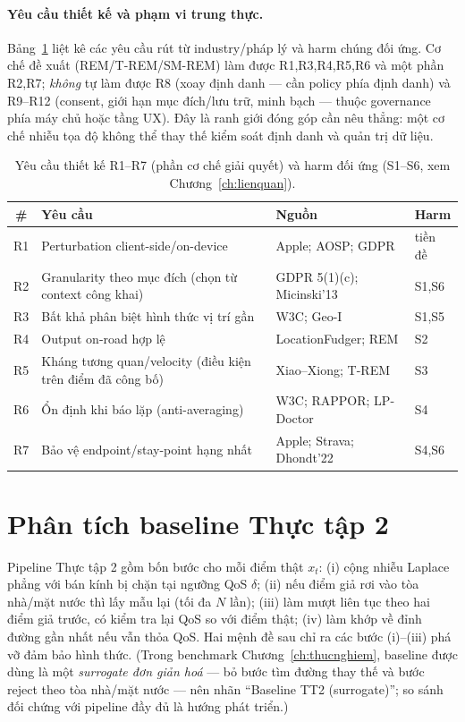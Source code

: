 \paragraph{Yêu cầu thiết kế và phạm vi trung thực.} Bảng~\ref{tab:requirements}
liệt kê các yêu cầu rút từ industry/pháp lý và harm chúng đối ứng. Cơ chế đề xuất
(REM/T-REM/SM-REM) làm được R1,R3,R4,R5,R6 và một phần R2,R7; \emph{không} tự làm
được R8 (xoay định danh --- cần policy phía định danh) và R9--R12 (consent, giới
hạn mục đích/lưu trữ, minh bạch --- thuộc governance phía máy chủ hoặc tầng UX).
Đây là ranh giới đóng góp cần nêu thẳng: một cơ chế nhiễu tọa độ không thể thay
thế kiểm soát định danh và quản trị dữ liệu.

\begin{table}[ht]
\centering
\caption{Yêu cầu thiết kế R1--R7 (phần cơ chế giải quyết) và harm đối ứng
(S1--S6, xem Chương~\ref{ch:lienquan}).}
\label{tab:requirements}
\small
\begin{tabular}{clll}
\toprule
\# & Yêu cầu & Nguồn & Harm \\
\midrule
R1 & Perturbation client-side/on-device & Apple; AOSP; GDPR & tiền đề \\
R2 & Granularity theo mục đích (chọn từ context công khai) & GDPR 5(1)(c); Micinski'13 & S1,S6 \\
R3 & Bất khả phân biệt hình thức vị trí gần & W3C; Geo-I & S1,S5 \\
R4 & Output on-road hợp lệ & LocationFudger; REM & S2 \\
R5 & Kháng tương quan/velocity (điều kiện trên điểm đã công bố) & Xiao--Xiong; T-REM & S3 \\
R6 & Ổn định khi báo lặp (anti-averaging) & W3C; RAPPOR; LP-Doctor & S4 \\
R7 & Bảo vệ endpoint/stay-point hạng nhất & Apple; Strava; Dhondt'22 & S4,S6 \\
\bottomrule
\end{tabular}
\end{table}

\section{Phân tích baseline Thực tập 2}
\label{sec:phantichbaseline}

Pipeline Thực tập 2 gồm bốn bước cho mỗi điểm thật $x_t$: (i) cộng nhiễu Laplace
phẳng với bán kính bị chặn tại ngưỡng QoS $\delta$; (ii) nếu điểm giả rơi vào
tòa nhà/mặt nước thì lấy mẫu lại (tối đa $N$ lần); (iii) làm mượt liên tục theo
hai điểm giả trước, có kiểm tra lại QoS so với điểm thật; (iv) làm khớp về đỉnh
đường gần nhất nếu vẫn thỏa QoS. Hai mệnh đề sau chỉ ra các bước (i)--(iii) phá
vỡ đảm bảo hình thức. (Trong benchmark Chương~\ref{ch:thucnghiem}, baseline được
dùng là một \emph{surrogate đơn giản hoá} --- bỏ bước tìm đường thay thế và bước
reject theo tòa nhà/mặt nước --- nên nhãn ``Baseline TT2 (surrogate)''; so sánh
đối chứng với pipeline đầy đủ là hướng phát triển.)

